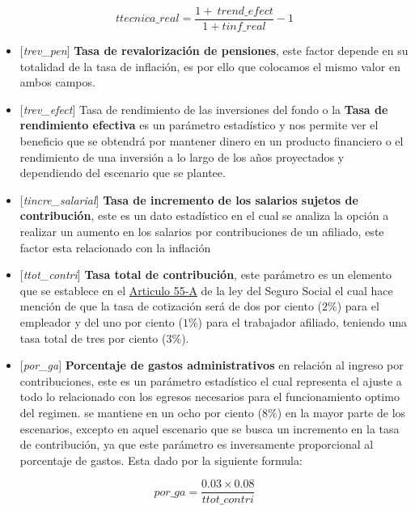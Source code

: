 \documentclass[
  letterpaper,
  DIV=11,
  numbers=noendperiod]{scrreprt}
\begin{document}
\begin{equation} 
ttecnica\_{real}=\frac{1+\ trend\_{efect}}{1+ tinf\_{real}}-1
 \label{eq:ttreal}
\end{equation}

\begin{itemize}
\item
  {[}\emph{trev\_pen}{]} \textbf{Tasa de revalorización de pensiones},
  este factor depende en su totalidad de la tasa de inflación, es por
  ello que colocamos el mismo valor en ambos campos.
\item
  {[}\emph{trev\_efect}{]} Tasa de rendimiento de las inversiones del
  fondo o la \textbf{Tasa de rendimiento efectiva} es un parámetro
  estadístico y nos permite ver el beneficio que se obtendrá por
  mantener dinero en un producto financiero o el rendimiento de una
  inversión a lo largo de los años proyectados y dependiendo del
  escenario que se plantee.
\item
  {[}\emph{tincre\_salarial}{]} \textbf{Tasa de incremento de los
  salarios sujetos de contribución}, este es un dato estadístico en el
  cual se analiza la opción a realizar un aumento en los salarios por
  contribuciones de un afiliado, este factor esta relacionado con la
  inflación
\item
  {[}\emph{ttot\_contri}{]} \textbf{Tasa total de contribución}, este
  parámetro es un elemento que se establece en el
  \href{https://honduras.eregulations.org/media/ley_del_seguro_social.pdf}{Articulo
  55-A} de la ley del Seguro Social el cual hace mención de que la tasa
  de cotización será de dos por ciento (\(2\%\)) para el empleador y del
  uno por ciento (\(1\%\)) para el trabajador afiliado, teniendo una
  tasa total de tres por ciento (\(3\%\)).
\item
  {[}\emph{por\_ga}{]} \textbf{Porcentaje de gastos administrativos} en
  relación al ingreso por contribuciones, este es un parámetro
  estadístico el cual representa el ajuste a todo lo relacionado con los
  egresos necesarios para el funcionamiento optimo del regimen. se
  mantiene en un ocho por ciento (\(8\%\)) en la mayor parte de los
  escenarios, excepto en aquel escenario que se busca un incremento en
  la tasa de contribución, ya que este parámetro es inversamente
  proporcional al porcentaje de gastos. Esta dado por la siguiente
  formula:
\end{itemize}

\begin{equation} 
por\_{ga}=\frac{0.03\times 0.08}{ttot\_{contri}}
 \label{eq:porga}
\end{equation}
\end{document}
